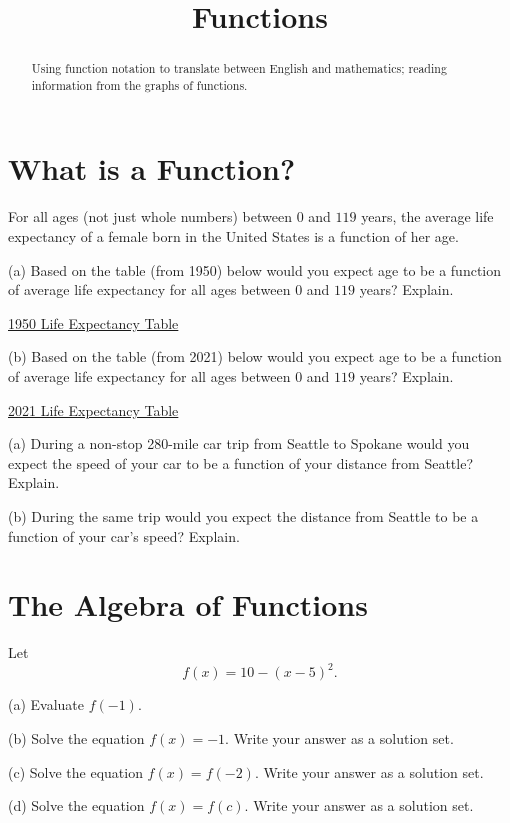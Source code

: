 \documentclass{ximera}
\title{Functions}
\begin{document}
\begin{abstract}
Using function notation to translate between English and mathematics; reading information from the graphs of functions.
\end{abstract}
\maketitle

\section{What is a Function?}

\begin{question} \label{Qdfewrr5hgyh}
For all ages (not just whole numbers) between $0$ and $119$ years, the average life expectancy of a female born in the United States is a function of her age.

(a) Based on the table (from 1950) below would you expect age to be a function of average life expectancy for all ages between  $0$ and $119$ years? Explain.

\href{https://www.ssa.gov/oact/NOTES/as120/LifeTables_Tbl_7_1950.html}{1950 Life Expectancy Table}


(b)  Based on the table (from 2021) below would you expect age to be a function of average life expectancy for all ages between  $0$ and $119$ years? Explain.

\href{https://www.ssa.gov/oact/STATS/table4c6.html}{2021 Life Expectancy Table}

\end{question}

\begin{question}  \label{Qdf4rr3gg}
(a) During a non-stop 280-mile car trip from Seattle to Spokane would you expect the speed of your car to be a function of your distance from Seattle? Explain.

(b) During the same trip would you expect the distance from Seattle to be a function of your car's speed? Explain.
\end{question}



\section{The Algebra of Functions}


\begin{question} \label{Q9844230}
Let 
\[
     f(x) = 10 - (x-5)^2 .
\]

(a) Evaluate $f(-1)$.

(b) Solve the equation $f(x)=-1$. Write your answer as a solution set.

(c) Solve the equation $f(x) = f(-2)$. Write your answer as a solution set.

(d) Solve the equation $f(x) = f(c)$. Write your answer as a solution set.

\end{question}
\end{document}

